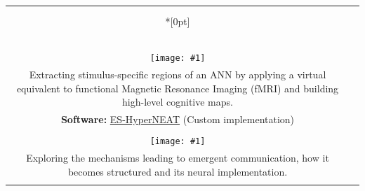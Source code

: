\documentclass[a4paper,12pt,final]{article}
\makeatletter
\newcommand{\prettyuline}[1]{%
 \uline{\phantom{#1}}%
 \llap{\contour{white}{#1}}%
}
\newlength\lwidth
\newlength\rwidth
\newlength\titlewidth
\newlength\titleoffset
\newenvironment{sect}[2][{\\*[0pt]}]{%
 \def\title{\Large\prettyuline{\texttt{\textbf{#2}}}}%
 \setlength{\titlewidth}{\widthof{\title}}%
 \setlength{\titleoffset}{\maxof{0pt}{\lwidth-\titlewidth*\real{0.5}}}%
%  
 \begin{longtable}{@{}c|c@{}}%
  \multicolumn{2}{l}{\hspace{\titleoffset}\title}\vspace{-2.9pt}\\*#1%
}{%
 \end{longtable}%
}%
\def\dbgrule{}
\newcommand{\itm}[3]{%
\dbgrule%
 \makecell[t{p{\lwidth}}]{%
  \raggedleft%
  \ifx\hfuzz#1\hfuzz\else%
   \textbf{#1}%
   \ifx\hfuzz#2\hfuzz\else\\\fi%
  \fi%
  #2%
 } & \makecell[t{p{\rwidth}}]{#3} \\
\dbgrule
}
\makeatother
\begin{document}
\newcommand{\ritm}[5]{%
 \itm{}{%
  \begin{minipage}[t]{\lwidth}%
   \vspace{0pt}%
   \raggedleft
   \texttt{[image: \#1]}%
  \end{minipage}%
 }{%
  \begin{minipage}[t]{\rwidth}%
   \vspace{0pt}\small%
   \cite{#4} \textsc{\En{#2}\Fr{#3}} \\%
   #5%
  \end{minipage}%
 }
}
\newcommand{\sref}[3][Software]{\textbf{#1:} \href{#2}{#3}}
\begin{sect}{Research}
 \itm{Synopsis}{}{%
  \small My main interests revolve around the production of autonomous artificial life forms: from the autonomous design of efficient morphologies to the emergence of high-level control schemes and the evolutionary constraints that favor both.
  The former and latter were investigated throughout my thesis whereas my more recent work deals with Artificial Neural Networks (ANN), with a special focus on the transition from communication to language and its neural implementation.
 }
 \\
 
 \itm{Artificial Neural Networks}{}{
  Studying the emergence of various ``cognitive'' capabilities in virtual robots, controlled by a spontaneously differentiated neural network, in response to biologically plausible stimuli.
 }
 \ritm{ann_vfmri_colored}{Virtual fMRI}{IRMf virtuelle}{GodinDubois2021a,GodinDubois2023}{
  Extracting stimulus-specific regions of an ANN by applying a virtual equivalent to functional Magnetic Resonance Imaging (fMRI) and building high-level cognitive maps. \\
  \sref{https://github.com/kgd-al/ES-HyperNEAT}{ES-HyperNEAT} (Custom implementation)
 }
 \ritm{communication}{Communication}{Communication}{GodinDubois2021b,GodinDubois2022a}{
  Exploring the mechanisms leading to emergent communication, how it becomes structured and its neural implementation.
 }
 \\[.5em]


\end{sect}
\end{document}
